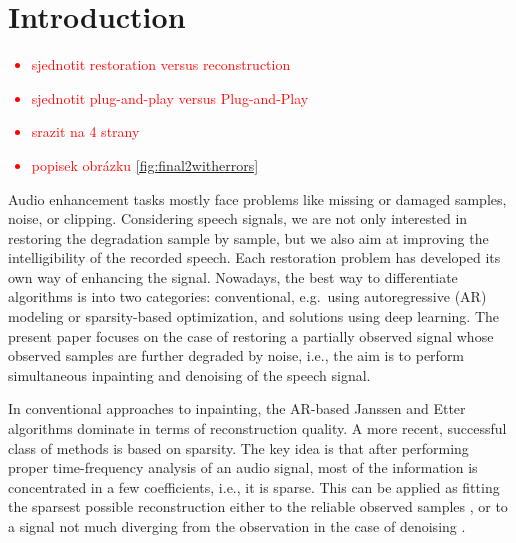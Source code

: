 \documentclass[conference]{IEEEtran}
\newcommand{\todo}[1]{\textcolor{red}{#1}}
\begin{document}
\section{Introduction}

\todo{\begin{itemize}
	\item sjednotit restoration versus reconstruction
	\item sjednotit plug-and-play versus Plug-and-Play
	\item srazit na 4 strany
	\item popisek obrázku \ref{fig:final2witherrors}
\end{itemize}}

Audio enhancement tasks mostly face problems like missing or damaged samples, noise, or clipping.
Considering speech signals, we %
are not only interested in restoring the degradation sample by sample, but we also aim at improving the intelligibility of the recorded speech.
Each restoration problem has developed its own way of enhancing the signal.
Nowadays, the best way to differentiate algorithms is into two categories:
conventional, e.g.\ using autoregressive (AR) modeling or sparsity-based optimization, and solutions using deep learning.
The present paper focuses on the case of restoring a partially observed signal whose observed samples are further degraded by noise, i.e., the aim is to perform simultaneous inpainting and denoising of the speech signal.

In conventional approaches to inpainting, the AR-based Janssen \cite{Janssen1986} and Etter~\cite{Etter1996} algorithms dominate in terms of reconstruction quality.
A more recent, successful class of methods is based on sparsity.
The key idea is that after performing proper time-frequency analysis of an audio signal,
most of the information is concentrated in a few coefficients, i.e., it is sparse.
This can be applied as fitting the sparsest possible reconstruction either to the reliable observed samples \cite{Adler2012, Kitic2015, Zaviska2019, Mokry2019}, or to a signal not much diverging from the observation in the case of denoising \cite{Kowalski2013}.
\end{document}
